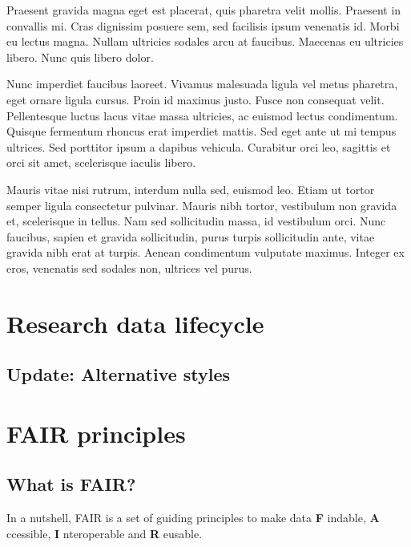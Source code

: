 \documentclass[
]{book}
\begin{document}
Praesent gravida magna eget est placerat, quis pharetra velit mollis. Praesent in convallis mi. Cras dignissim posuere sem, sed facilisis ipsum venenatis id. Morbi eu lectus magna. Nullam ultricies sodales arcu at faucibus. Maecenas eu ultricies libero. Nunc quis libero dolor.

Nunc imperdiet faucibus laoreet. Vivamus malesuada ligula vel metus pharetra, eget ornare ligula cursus. Proin id maximus justo. Fusce non consequat velit. Pellentesque luctus lacus vitae massa ultricies, ac euismod lectus condimentum. Quisque fermentum rhoncus erat imperdiet mattis. Sed eget ante ut mi tempus ultrices. Sed porttitor ipsum a dapibus vehicula. Curabitur orci leo, sagittis et orci sit amet, scelerisque iaculis libero.

Mauris vitae nisi rutrum, interdum nulla sed, euismod leo. Etiam ut tortor semper ligula consectetur pulvinar. Mauris nibh tortor, vestibulum non gravida et, scelerisque in tellus. Nam sed sollicitudin massa, id vestibulum orci. Nunc faucibus, sapien et gravida sollicitudin, purus turpis sollicitudin ante, vitae gravida nibh erat at turpis. Aenean condimentum vulputate maximus. Integer ex eros, venenatis sed sodales non, ultrices vel purus.

\hypertarget{research-data-lifecycle}{%
\chapter{Research data lifecycle}\label{research-data-lifecycle}}

\hypertarget{update-alternative-styles}{%
\section{Update: Alternative styles}\label{update-alternative-styles}}

\hypertarget{fair-principles}{%
\chapter{FAIR principles}\label{fair-principles}}

\hypertarget{what-is-fair}{%
\section{What is FAIR?}\label{what-is-fair}}

In a nutshell, FAIR is a set of guiding principles to make data \textbf{F} indable, \textbf{A} ccessible, \textbf{I} nteroperable and \textbf{R} eusable.
\end{document}
